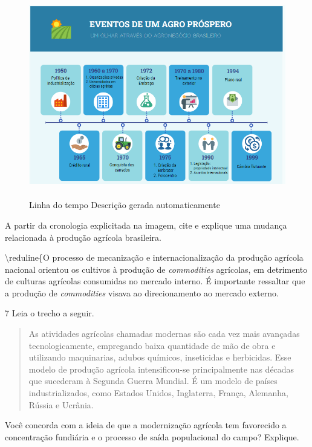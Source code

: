 \begin{figure}
\centering
\includegraphics[width=5.04002in,height=3.51806in]{./imgSAEB_9_CHUM6/media/image3.png}
\caption{Linha do tempo Descrição gerada automaticamente}
\end{figure}

A partir da cronologia explicitada na imagem, cite e explique uma
mudança relacionada à produção agrícola brasileira.

\textbackslash{}reduline\{O processo de mecanização e internacionalização
da produção agrícola nacional orientou os cultivos à produção de
\emph{commodities} agrícolas, em detrimento de culturas agrícolas
consumidas no mercado interno. É importante ressaltar que a produção de
\emph{commodities} visava ao direcionamento ao mercado externo.

\num{7} Leia o trecho a seguir.

\begin{quote}
As atividades agrícolas chamadas modernas são cada vez mais avançadas
tecnologicamente, empregando baixa quantidade de mão de obra e
utilizando maquinarias, adubos químicos, inseticidas e herbicidas. Esse
modelo de produção agrícola intensificou-se principalmente nas décadas
que sucederam à Segunda Guerra Mundial. É um modelo de países
industrializados, como Estados Unidos, Inglaterra, França, Alemanha,
Rússia e Ucrânia.
\end{quote}


Você concorda com a ideia de que a modernização agrícola tem favorecido
a concentração fundiária e o processo de saída populacional do campo?
Explique.

